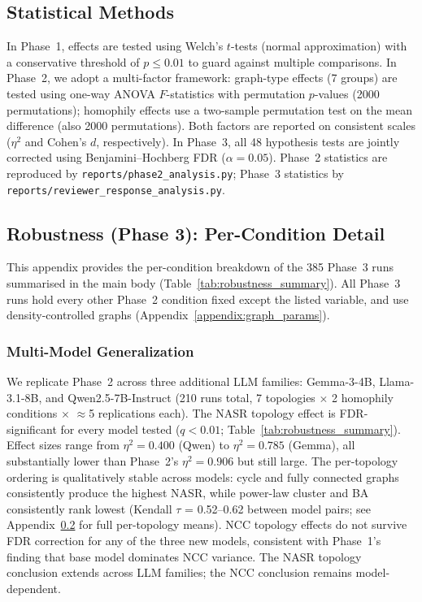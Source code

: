 \documentclass[11pt]{article}
\begin{document}
\subsection{Statistical Methods}
\label{appendix:statistical_methods}
In Phase~1, effects are tested using Welch's $t$-tests (normal approximation) with a conservative threshold of $p \leq 0.01$ to guard against multiple comparisons. In Phase~2, we adopt a multi-factor framework: graph-type effects (7 groups) are tested using one-way ANOVA $F$-statistics with permutation $p$-values (2000 permutations); homophily effects use a two-sample permutation test on the mean difference (also 2000 permutations). Both factors are reported on consistent scales ($\eta^2$ and Cohen's $d$, respectively). In Phase~3, all 48 hypothesis tests are jointly corrected using Benjamini--Hochberg FDR ($\alpha = 0.05$). Phase~2 statistics are reproduced by \texttt{reports/phase2\_analysis.py}; Phase~3 statistics by \texttt{reports/reviewer\_response\_analysis.py}.

\subsection{Robustness (Phase 3): Per-Condition Detail}
\label{appendix:robustness_detail}

This appendix provides the per-condition breakdown of the 385 Phase~3 runs summarised in the main body (Table~\ref{tab:robustness_summary}). All Phase~3 runs hold every other Phase~2 condition fixed except the listed variable, and use density-controlled graphs (Appendix~\ref{appendix:graph_params}).

\subsubsection{Multi-Model Generalization}

We replicate Phase~2 across three additional LLM families: Gemma-3-4B, Llama-3.1-8B, and Qwen2.5-7B-Instruct (210 runs total, 7 topologies $\times$ 2 homophily conditions $\times$ $\approx$5 replications each). The NASR topology effect is FDR-significant for every model tested ($q < 0.01$; Table~\ref{tab:robustness_summary}). Effect sizes range from $\eta^2 = 0.400$ (Qwen) to $\eta^2 = 0.785$ (Gemma), all substantially lower than Phase~2's $\eta^2 = 0.906$ but still large. The per-topology ordering is qualitatively stable across models: cycle and fully connected graphs consistently produce the highest NASR, while power-law cluster and BA consistently rank lowest (Kendall $\tau$ = 0.52--0.62 between model pairs; see Appendix~\ref{appendix:robustness_detail} for full per-topology means). NCC topology effects do not survive FDR correction for any of the three new models, consistent with Phase~1's finding that base model dominates NCC variance. The NASR topology conclusion extends across LLM families; the NCC conclusion remains model-dependent.
\end{document}
